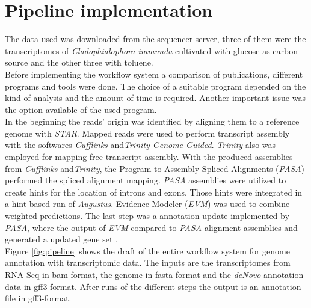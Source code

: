\documentclass[12pt, a4paper]{report}
\begin{document}
\section{Pipeline implementation}
The data used was downloaded from the sequencer-server, three of them were the transcriptomes of \textit{Cladophialophora immunda} cultivated with glucose as carbon-source and the other three with toluene. \\
Before implementing the workflow system a comparison of publications, different programs and tools were done. The choice of a suitable program depended on the kind of analysis and the amount of time is required. Another important issue was the option available of the used program. \\
In the beginning the reads' origin was identified by aligning them to a reference genome with \textit{STAR}. Mapped reads were used to perform transcript assembly with the softwares \textit{Cufflinks} and\textit{Trinity Genome Guided}. \textit{Trinity} also was employed for mapping-free transcript assembly. With the produced assemblies from \textit{Cufflinks} and\textit{Trinity}, the Program to Assembly Spliced Alignments (\textit{PASA}) performed the spliced alignment mapping. \textit{PASA} assemblies were utilized to create hints for the location of introns and exons. Those hints were integrated in a hint-based run of \textit{Augustus}. Evidence Modeler (\textit{EVM}) was used to combine weighted predictions. The last step was a annotation update implemented by \textit{PASA}, where the output of \textit{EVM} compared to \textit{PASA} alignment assemblies and generated a updated gene set \cite{Haas2011, Steijger2013, Linde2015}.  \\
Figure \ref{fig:pipeline} shows the draft of the entire workflow system for genome annotation with transcriptomic data. The inputs are the transcriptomes from RNA-Seq in bam-format, the genome in fasta-format and the \textit{deNovo} annotation data in gff3-format. After runs of the different steps the output is an annotation file in gff3-format.
\end{document}
